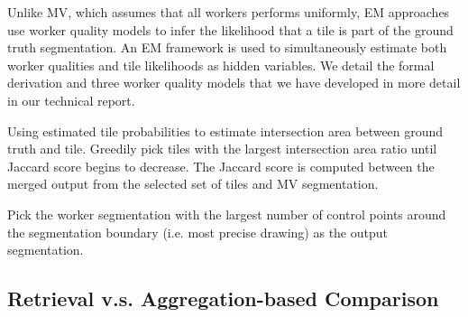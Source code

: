 Unlike MV, which assumes that all workers performs uniformly, EM approaches use worker quality models to infer the likelihood that a tile is part of the ground truth segmentation. An EM framework is used to simultaneously estimate both worker qualities and tile likelihoods as hidden variables. We detail the formal derivation and three worker quality models that we have developed in more detail in our technical report.

 Using estimated tile probabilities to estimate intersection area between ground truth and tile. Greedily pick tiles with the largest intersection area ratio until Jaccard score begins to decrease. The Jaccard score is computed between the merged output from the selected set of tiles and MV segmentation.

Pick the worker segmentation with the largest number of control points around the segmentation boundary (i.e. most precise drawing) as the output segmentation.

\subsection{Retrieval v.s. Aggregation-based Comparison}


